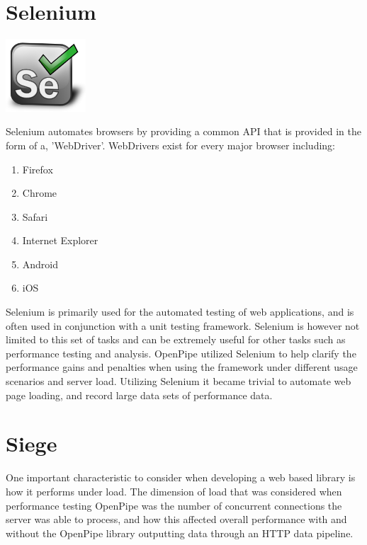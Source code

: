 \documentclass[12pt]{report}
\begin{document}
\section{Selenium}
\begin{center}
\includegraphics[width=30mm]{figures/images/Selenium_logo.png}
\end{center}

Selenium automates browsers by providing a common API that is provided in the form of a, 'WebDriver'. WebDrivers exist for every major browser including:

\begin{enumerate}
\item Firefox
\item Chrome
\item Safari
\item Internet Explorer
\item Android
\item iOS
\end{enumerate}

Selenium is primarily used for the automated testing of web applications, and is often used in conjunction with a unit testing framework.  Selenium is however not limited to this set of tasks and can be extremely useful for other tasks such as performance testing and analysis. OpenPipe utilized Selenium to help clarify the performance gains and penalties when using the framework under different usage scenarios and server load. Utilizing Selenium it became trivial to automate web page loading, and record large data sets of performance data.



\section{Siege}
One important characteristic to consider when developing a web based library is how it performs under load. The dimension of load that was considered when performance testing OpenPipe was the number of concurrent connections the server was able to process, and how this affected overall performance with and without the OpenPipe library outputting data through an HTTP data pipeline.
\end{document}
